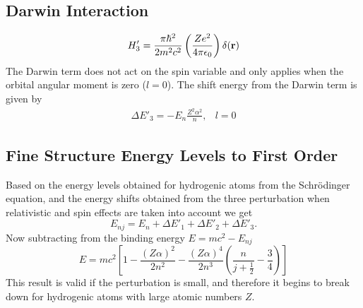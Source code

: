 \documentclass[a4paper]{IEEEtran}
\begin{document}
	\subsection{Darwin Interaction}
	\begin{equation}
		H'_3 = \frac{\pi\hbar^2}{2m^2c^2} \left( \frac{Ze^2}{4\pi\epsilon_0} \right) \delta(\bf{r})
	\end{equation}
    The Darwin term does not act on the spin variable and only applies when
    the orbital angular moment is zero ($l=0$).
    The shift energy from the Darwin term is given by
    \begin{equation}
        \begin{array}{ll}
        \Delta E'_3 = -E_n \frac{Z^2 \alpha^2}{n} , & l = 0
        \end{array}
    \end{equation}

    \subsection{Fine Structure Energy Levels to First Order}
    Based on the energy levels obtained for hydrogenic atoms from the Schr\"odinger equation,
    and the energy shifts obtained from the three perturbation when relativistic and
    spin effects are taken into account we get
    \begin{equation}
        E_{nj} = E_n + \Delta E'_1 + \Delta E'_2 + \Delta E'_3.
    \end{equation}
    Now subtracting from the binding energy $E = mc^2 - E_{nj}$ 
    \begin{equation}
        E = mc^2 \left[ 1 - \frac{(Z \alpha)^2}{2n^2} - \frac{(Z \alpha)^4}{2n^3} 
                        \left(
                            \frac{n}{j + \frac{1}{2}} - \frac{3}{4}
                        \right)
                    \right] 
    \end{equation}
    This result is valid if the perturbation is small, and therefore it begins to break down
    for hydrogenic atoms with large atomic numbers $Z$.
\end{document}
